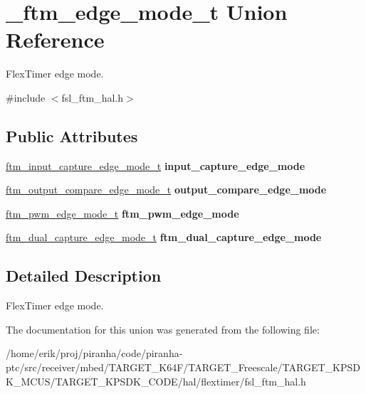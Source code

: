 \hypertarget{union__ftm__edge__mode__t}{}\section{\+\_\+ftm\+\_\+edge\+\_\+mode\+\_\+t Union Reference}
\label{union__ftm__edge__mode__t}


Flex\+Timer edge mode.  




{\ttfamily \#include $<$fsl\+\_\+ftm\+\_\+hal.\+h$>$}

\subsection*{Public Attributes}
\begin{DoxyCompactItemize}
\item 
\hyperlink{group__ftm__hal_gaa7f75061d288318028ebdfa90b27de12}{ftm\+\_\+input\+\_\+capture\+\_\+edge\+\_\+mode\+\_\+t} {\bfseries input\+\_\+capture\+\_\+edge\+\_\+mode}\hypertarget{union__ftm__edge__mode__t_a503e224d97a95b5d0b59bcd97136b418}{}\label{union__ftm__edge__mode__t_a503e224d97a95b5d0b59bcd97136b418}

\item 
\hyperlink{group__ftm__hal_ga025e4209539b48426a53d1351e0288a5}{ftm\+\_\+output\+\_\+compare\+\_\+edge\+\_\+mode\+\_\+t} {\bfseries output\+\_\+compare\+\_\+edge\+\_\+mode}\hypertarget{union__ftm__edge__mode__t_a20af8d8fc9e753000984f74da4322b11}{}\label{union__ftm__edge__mode__t_a20af8d8fc9e753000984f74da4322b11}

\item 
\hyperlink{group__ftm__hal_gad072678496c10bf3ebe1bba980a8ec7d}{ftm\+\_\+pwm\+\_\+edge\+\_\+mode\+\_\+t} {\bfseries ftm\+\_\+pwm\+\_\+edge\+\_\+mode}\hypertarget{union__ftm__edge__mode__t_ac68af4abce9f0937b19b5555bfa838af}{}\label{union__ftm__edge__mode__t_ac68af4abce9f0937b19b5555bfa838af}

\item 
\hyperlink{group__ftm__hal_ga5550fba8c8c9ccf1946b76e97bf497c0}{ftm\+\_\+dual\+\_\+capture\+\_\+edge\+\_\+mode\+\_\+t} {\bfseries ftm\+\_\+dual\+\_\+capture\+\_\+edge\+\_\+mode}\hypertarget{union__ftm__edge__mode__t_afa97555d43f233134ed3302dca637a72}{}\label{union__ftm__edge__mode__t_afa97555d43f233134ed3302dca637a72}

\end{DoxyCompactItemize}


\subsection{Detailed Description}
Flex\+Timer edge mode. 

The documentation for this union was generated from the following file\+:\begin{DoxyCompactItemize}
\item 
/home/erik/proj/piranha/code/piranha-\/ptc/src/receiver/mbed/\+T\+A\+R\+G\+E\+T\+\_\+\+K64\+F/\+T\+A\+R\+G\+E\+T\+\_\+\+Freescale/\+T\+A\+R\+G\+E\+T\+\_\+\+K\+P\+S\+D\+K\+\_\+\+M\+C\+U\+S/\+T\+A\+R\+G\+E\+T\+\_\+\+K\+P\+S\+D\+K\+\_\+\+C\+O\+D\+E/hal/flextimer/fsl\+\_\+ftm\+\_\+hal.\+h\end{DoxyCompactItemize}
